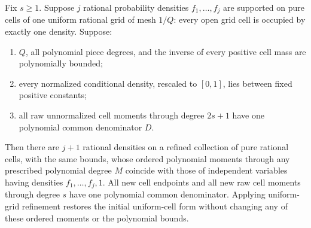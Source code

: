 \documentclass[11pt]{article}
\begin{document}
\begin{lemma}\label{insert}
Fix $s\ge1$. Suppose $j$ rational probability densities $f_1,\ldots,f_j$
are supported on pure cells of one uniform rational grid of mesh $1/Q$:
every open grid cell is occupied by exactly one density. Suppose:
\begin{enumerate}
\item $Q$, all polynomial piece degrees, and the inverse of every
positive cell mass are polynomially bounded;
\item every normalized conditional density, rescaled to $[0,1]$, lies
between fixed positive constants;
\item all raw unnormalized cell moments through degree $2s+1$ have one
polynomial common denominator $D$.
\end{enumerate}
Then there are $j+1$ rational densities on a refined collection of pure
rational cells, with the same bounds, whose ordered polynomial moments
through any prescribed polynomial degree $M$ coincide with those of
independent variables having densities $f_1,\ldots,f_j,1$.
All new cell endpoints and all new raw cell moments through degree $s$
have one polynomial common denominator. Applying uniform-grid refinement
restores the initial uniform-cell form without changing any of these
ordered moments or the polynomial bounds.
\end{lemma}
\end{document}
